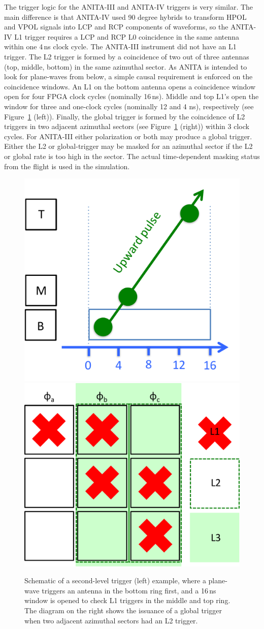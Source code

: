 The trigger logic for the ANITA-III and ANITA-IV triggers is very similar.
The main difference is that ANITA-IV used 90 degree hybrids to transform HPOL and VPOL signals into LCP and RCP components of waveforms, so the ANITA-IV L1 trigger requires a LCP and RCP L0 coincidence in the same antenna within one 4\,ns clock cycle.
The ANITA-III instrument did not have an L1 trigger.
The L2 trigger is formed by a coincidence of two out of three
antennas (top, middle, bottom) in the same azimuthal
sector. As ANITA is intended to look for plane-waves from below, a simple
causal requirement is enforced on the coincidence windows.  An L1 on the bottom
antenna opens a coincidence window open for four FPGA clock cycles (nominally 16\,ns).
Middle and top L1's open the window for three and one-clock cycles (nominally 12 and 4
ns), respectively (see
Figure~\ref{fig:ANITA_triggerLogic} (left)).  
Finally, the global trigger is formed by the coincidence of L2 triggers in
two adjacent azimuthal sectors (see Figure~\ref{fig:ANITA_triggerLogic} (right)) within 3 clock cycles.
For ANITA-III either polarization or both may produce a global trigger. 
Either the L2 or global-trigger may be masked for an
azimuthal sector if the L2 or global rate is too high in the sector.
The actual time-dependent masking status from the flight is used in the simulation.


\begin{figure}[!h]\centering
  \includegraphics[width=.45\linewidth]{./Figs/ANITA3_l1trigger.pdf}
  \includegraphics[width=.45\linewidth]{./Figs/ANITA3_globalTrigger.pdf}
  \caption{Schematic of a second-level trigger (left) example, where a
  plane-wave triggers an antenna in the bottom ring first, and a
  16\,ns window is opened to check L1 triggers in the middle and top
  ring.
The diagram on the right shows the issuance of a global trigger when two
adjacent azimuthal sectors had an L2 trigger.}
  \label{fig:ANITA_triggerLogic}
\end{figure}




